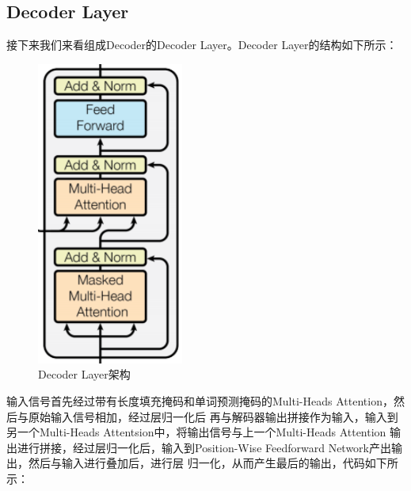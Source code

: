 \documentclass{article}
\begin{document}
\subsection{Decoder Layer}
接下来我们来看组成Decoder的Decoder Layer。Decoder Layer的结构如下所示：
\begin{figure}[H]
    \caption{Decoder Layer架构}
    \label{f000083}
    \centering
    \includegraphics[height=10cm]{images/f000083}
\end{figure}
输入信号首先经过带有长度填充掩码和单词预测掩码的Multi-Heads Attention，然后与原始输入信号相加，经过层归一化后
再与解码器输出拼接作为输入，输入到另一个Multi-Heads Attentsion中，将输出信号与上一个Multi-Heads Attention
输出进行拼接，经过层归一化后，输入到Position-Wise Feedforward Network产出输出，然后与输入进行叠加后，进行层
归一化，从而产生最后的输出，代码如下所示：
\end{document}
